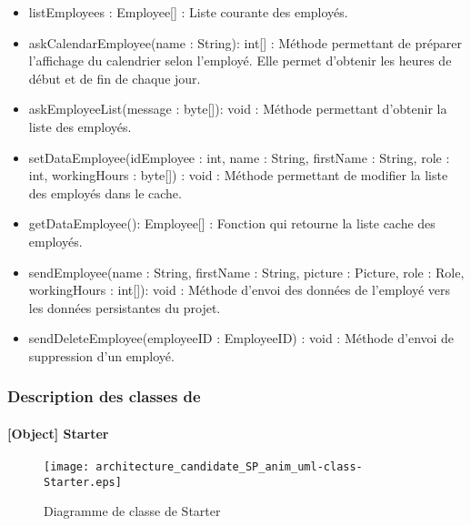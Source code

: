             \begin{itemize}
                \item {listEmployees : Employee[] : Liste courante des employés.}       
            \end{itemize} 
            \begin{itemize}
                \item {askCalendarEmployee(name : String): int[] : Méthode permettant de préparer l'affichage du calendrier selon l'employé. Elle permet d'obtenir les heures de début et de fin de chaque jour.}       
                \item {askEmployeeList(message : byte[]): void : Méthode permettant d'obtenir la liste des employés.}             
                \item {setDataEmployee(idEmployee : int, name : String, firstName : String, role : int, workingHours : byte[]) : void : Méthode permettant de modifier la liste des employés dans le cache.}
                \item {getDataEmployee(): Employee[] : Fonction qui retourne la liste cache des employés.}
                \item {sendEmployee(name : String, firstName : String, picture : Picture, role : Role, workingHours : int[]): void : Méthode d'envoi des données de l'employé vers les données persistantes du projet.}
                \item {sendDeleteEmployee(employeeID : EmployeeID) : void : Méthode d'envoi de suppression d'un employé.}
            \end{itemize}

\newpage 

\subsubsection{Description des classes de \appliPo}%
    
    \paragraph{[Object] Starter}%

        \begin{figure} [H]
            \centering
            \texttt{[image: architecture\_candidate\_SP\_anim\_uml-class-Starter.eps]}
            \caption{Diagramme de classe de Starter}
            \label{Class-Starter}
        \end{figure}
    
